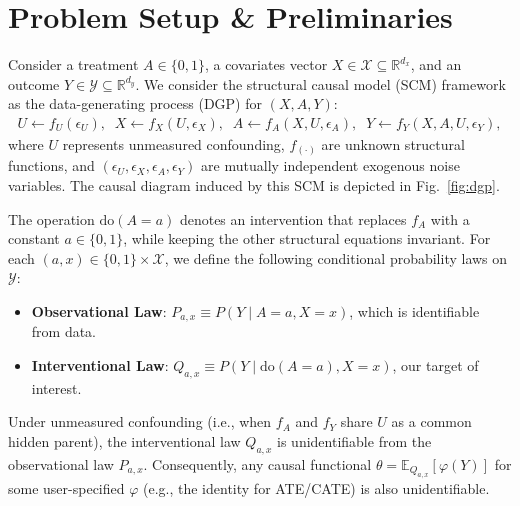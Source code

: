 \section{Problem Setup \& Preliminaries}
Consider a treatment $A \in \{0, 1\}$, a covariates vector $X \in \mathcal{X} \subseteq \mathbb{R}^{d_x}$, and an outcome $Y \in \mathcal{Y} \subseteq \mathbb{R}^{d_y}$. We consider the structural causal model (SCM) framework \citep{pearl:2k} as the data-generating process (DGP) for $(X, A, Y)$:
\begin{align}\label{def:scm}
    U \leftarrow f_U(\epsilon_U), \;\; X \leftarrow f_X(U, \epsilon_X), \;\;A \leftarrow f_A(X, U, \epsilon_A), \;\;Y \leftarrow f_Y(X, A, U, \epsilon_Y),
\end{align}
where $U$ represents unmeasured confounding, $f_{(\cdot)}$ are unknown structural functions, and $(\epsilon_U, \epsilon_X, \epsilon_A, \epsilon_Y)$ are mutually independent exogenous noise variables. The causal diagram induced by this SCM is depicted in Fig.~\ref{fig:dgp}. 

The operation $\mathrm{do}(A=a)$ denotes an intervention that replaces $f_A$ with a constant $a \in \{0,1\}$, while keeping the other structural equations invariant. For each $(a, x) \in \{0, 1\} \times \mathcal{X}$, we define the following conditional probability laws on $\mathcal{Y}$:
\begin{itemize}[leftmargin=*,labelsep=0.5em]
    \item \textbf{Observational Law}: $P_{a, x} \equiv P(Y \mid A=a, X=x)$, which is identifiable from data.
    \item \textbf{Interventional Law}: $Q_{a, x} \equiv P(Y \mid \mathrm{do}(A=a), X=x)$, our target of interest.
\end{itemize}
Under unmeasured confounding (i.e., when $f_A$ and $f_Y$ share $U$ as a common hidden parent), the interventional law $Q_{a, x}$ is unidentifiable from the observational law $P_{a, x}$. Consequently, any causal functional $\theta = \mathbb{E}_{Q_{a,x}}[\varphi(Y)]$ for some user-specified $\varphi$ (e.g., the identity for ATE/CATE) is also unidentifiable.

